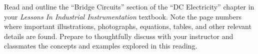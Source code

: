 

Read and outline the ``Bridge Circuits'' section of the ``DC Electricity'' chapter in your {\it Lessons In Industrial Instrumentation} textbook.  Note the page numbers where important illustrations, photographs, equations, tables, and other relevant details are found.  Prepare to thoughtfully discuss with your instructor and classmates the concepts and examples explored in this reading.
















